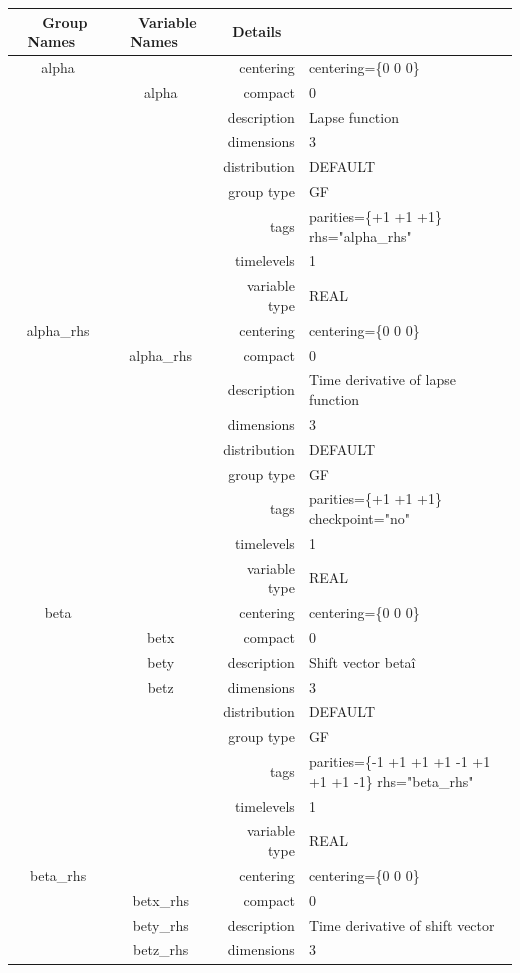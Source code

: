 \begin{tabular*}{150mm}{|c|c@{\extracolsep{\fill}}|rl|} \hline 
~ {\bf Group Names} ~ & ~ {\bf Variable Names} ~  &{\bf Details} ~ & ~\\ 
\hline 
alpha &  & centering & centering=\{0 0 0\} \\ 
 & alpha & compact & 0 \\ 
 &  & description & Lapse function \\ 
 &  & dimensions & 3 \\ 
 &  & distribution & DEFAULT \\ 
 &  & group type & GF \\ 
 &  & tags & parities=\{+1 +1 +1\} rhs="alpha\_rhs" \\ 
 &  & timelevels & 1 \\ 
 &  & variable type & REAL \\ 
\hline 
alpha\_rhs &  & centering & centering=\{0 0 0\} \\ 
 & alpha\_rhs & compact & 0 \\ 
 &  & description & Time derivative of lapse function \\ 
 &  & dimensions & 3 \\ 
 &  & distribution & DEFAULT \\ 
 &  & group type & GF \\ 
 &  & tags & parities=\{+1 +1 +1\} checkpoint="no" \\ 
 &  & timelevels & 1 \\ 
 &  & variable type & REAL \\ 
\hline 
beta &  & centering & centering=\{0 0 0\} \\ 
 & betx & compact & 0 \\ 
 & bety & description & Shift vector beta\^i \\ 
 & betz & dimensions & 3 \\ 
 &  & distribution & DEFAULT \\ 
 &  & group type & GF \\ 
 &  & tags & parities=\{-1 +1 +1  +1 -1 +1  +1 +1 -1\}  rhs="beta\_rhs" \\ 
 &  & timelevels & 1 \\ 
 &  & variable type & REAL \\ 
\hline 
beta\_rhs &  & centering & centering=\{0 0 0\} \\ 
 & betx\_rhs & compact & 0 \\ 
 & bety\_rhs & description & Time derivative of shift vector \\ 
 & betz\_rhs & dimensions & 3 \\ 

\end{tabular*}
